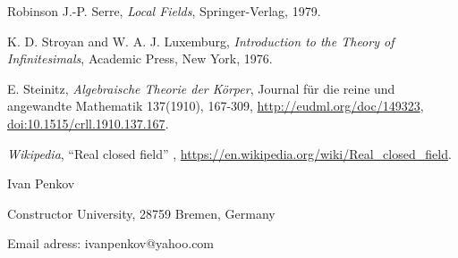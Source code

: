 \documentclass[11pt]{article}
\theoremstyle{plain}
\theoremstyle{definition}
\theoremstyle{remark}
\begin{document}
\begin{thebibliography}{Robinson}
    J.-P. Serre, \textit{Local Fields}, Springer-Verlag, 1979.

    K. D. Stroyan and W. A. J. Luxemburg, \textit{Introduction to the Theory of Infinitesimals}, Academic
    Press, New York, 1976.



    E. Steinitz, \textit{Algebraische Theorie der Körper}, Journal für
    die reine und angewandte Mathematik 137(1910), 167-309,
    \url{http://eudml.org/doc/149323}, \url{doi:10.1515/crll.1910.137.167}.
    
    \textit{Wikipedia}, ``Real closed field'' ,
    \url{https://en.wikipedia.org/wiki/Real_closed_field}.


    
    \end{thebibliography}
    \vspace{0.5cm}

    Ivan Penkov 
    
    Constructor University, 28759 Bremen, Germany

    Email adress: ivanpenkov@yahoo.com
\end{document}
